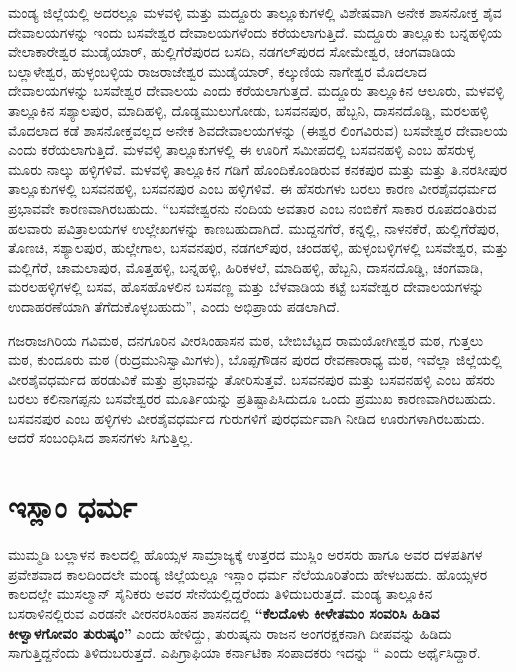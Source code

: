 ಮಂಡ್ಯ ಜಿಲ್ಲೆಯಲ್ಲಿ ಅದರಲ್ಲೂ ಮಳವಳ್ಳಿ ಮತ್ತು ಮದ್ದೂರು ತಾಲ್ಲೂಕುಗಳಲ್ಲಿ ವಿಶೇಷವಾಗಿ ಅನೇಕ ಶಾಸನೋಕ್ತ ಶೈವ ದೇವಾಲಯಗಳನ್ನು ಇಂದು ಬಸವೇಶ್ವರ ದೇವಾಲಯಗಳೆಂದು ಕರೆಯಲಾಗುತ್ತಿದೆ. ಮದ್ದೂರು ತಾಲ್ಲೂಕು ಬನ್ನಹಳ್ಳಿಯ ವೇಲಾಕಾರೇಶ್ವರ ಮುಡೈಯಾರ್​, ಹುಲ್ಲಿಗೆರೆಪುರದ ಬಸದಿ, ನಡಗಲ್​ಪುರದ ಸೋಮೇಶ್ವರ, ಚಂಗವಾಡಿಯ ಬಲ್ಲಾಳೇಶ್ವರ, ಹುಳ್ಳಂಬಳ್ಳಿಯ ರಾಜರಾಜೇಶ್ವರ ಮುಡೈಯಾರ್​, ಕಲ್ಕುಣಿಯ ನಾಗೇಶ್ವರ ಮೊದಲಾದ ದೇವಾಲಯಗಳನ್ನು ಬಸವೇಶ್ವರ ದೇವಾಲಯ ಎಂದು ಕರೆಯಲಾಗುತ್ತದೆ. ಮದ್ದೂರು ತಾಲ್ಲೂಕಿನ ಆಲೂರು, ಮಳವಳ್ಳಿ ತಾಲ್ಲೂಕಿನ ಸಶ್ಯಾಲಪುರ, ಮಾದಿಹಳ್ಳಿ, ದೊಡ್ಡಮುಲುಗೋಡು, ಬಸವನಪುರ, ಹೆಬ್ಬನಿ, ದಾಸನದೊಡ್ಡಿ, ಮರಲಹಳ್ಳಿ ಮೊದಲಾದ ಕಡೆ ಶಾಸನೋಕ್ತವಲ್ಲದ ಅನೇಕ ಶಿವದೇವಾಲಯಗಳನ್ನು (ಈಶ್ವರ ಲಿಂಗವಿರುವ) ಬಸವೇಶ್ವರ ದೇವಾಲಯ ಎಂದು ಕರೆಯಲಾಗುತ್ತಿದೆ. ಮಳವಳ್ಳಿ ತಾಲ್ಲೂಕುಗಳಲ್ಲಿ ಈ ಊರಿಗೆ ಸಮೀಪದಲ್ಲಿ ಬಸವನಹಳ್ಳಿ ಎಂಬ ಹೆಸರುಳ್ಳ ಮೂರು ನಾಲ್ಕು ಹಳ್ಳಿಗಳಿವೆ. ಮಳವಳ್ಳಿ ತಾಲ್ಲೂಕಿನ ಗಡಿಗೆ ಹೊಂದಿಕೊಂಡಿರುವ ಕನಕಪುರ ಮತ್ತು ಮತ್ತು ತಿ.ನರಸೀಪುರ ತಾಲ್ಲೂಕುಗಳಲ್ಲಿ ಬಸವನಹಳ್ಳಿ, ಬಸವನಪುರ ಎಂಬ ಹಳ್ಳಿಗಳಿವೆ. ಈ ಹೆಸರುಗಳು ಬರಲು ಕಾರಣ ವೀರಶೈವಧರ್ಮದ ಪ್ರಭಾವವೇ ಕಾರಣವಾಗಿರಬಹುದು. “ಬಸವೇಶ್ವರನು ನಂದಿಯ ಅವತಾರ ಎಂಬ ನಂಬಿಕೆಗೆ ಸಾಕಾರ ರೂಪದಂತಿರುವ ಹಲವಾರು ಪವಿತ್ರಾಲಯಗಳ ಉಲ್ಲೇಖಗಳನ್ನು ಕಾಣಬಹುದಾಗಿದೆ. ಮುದ್ದನಗೆರೆ, ಕನ್ನಲ್ಲಿ, ನಾಳನಕೆರೆ, ಹುಲ್ಲಿಗೆರೆಪುರ, ತೊಣಚಿ, ಸಶ್ಯಾಲಪುರ, ಹುಲ್ಲೇಗಾಲ, ಬಸವನಪುರ, ನಡಗಲ್​ಪುರ, ಚಂದಹಳ್ಳಿ, ಹುಳ್ಳಂಬಳ್ಳಿಗಳಲ್ಲಿ ಬಸವೇಶ್ವರ, ಮತ್ತು ಮಲ್ಲಿಗೆರೆ, ಚಾಮಲಾಪುರ, ಮೊತ್ತಹಳ್ಳಿ, ಬನ್ನಹಳ್ಳಿ, ಹಿರಿಕಳಲೆ, ಮಾದಿಹಳ್ಳಿ, ಹೆಬ್ಬನಿ, ದಾಸನದೊಡ್ಡಿ, ಚಂಗವಾಡಿ, ಮರಲಹಳ್ಳಿಗಳಲ್ಲಿ ಬಸವ, ಹೊಸಹೊಳಲಿನ ಬಸವಣ್ಣ ಮತ್ತು ಬೆಳವಾಡಿಯ ಕಟ್ಟೆ ಬಸವೇಶ್ವರ ದೇವಾಲಯಗಳನ್ನು ಉದಾಹರಣೆಯಾಗಿ ತೆಗೆದುಕೊಳ್ಳಬಹುದು”,  ಎಂದು ಅಭಿಪ್ರಾಯ ಪಡಲಾಗಿದೆ.

ಗಜರಾಜಗಿರಿಯ ಗವಿಮಠ, ದನಗೂರಿನ ವೀರಸಿಂಹಾಸನ ಮಠ, ಬೇಬಿಬೆಟ್ಟದ ರಾಮಯೋಗೀಶ್ವರ ಮಠ, ಗುತ್ತಲು ಮಠ, ಕುಂದೂರು ಮಠ (ರುದ್ರಮುನಿಸ್ವಾಮಿಗಳು), ಬೊಪ್ಪಗೌಡನ ಪುರದ ರೇವಣಾರಾಧ್ಯ ಮಠ, ಇವೆಲ್ಲಾ ಜಿಲ್ಲೆಯಲ್ಲಿ ವೀರಶೈವಧರ್ಮದ ಹರಡುವಿಕೆ ಮತ್ತು ಪ್ರಭಾವನ್ನು ತೋರಿಸುತ್ತವೆ. ಬಸವನಪುರ ಮತ್ತು ಬಸವನಹಳ್ಳಿ ಎಂಬ ಹೆಸರು ಬರಲು ಕಲಿನಾಗಪ್ಪನು ಬಸವೇಶ್ವರರ ಮೂರ್ತಿಯನ್ನು ಪ್ರತಿಷ್ಟಾಪಿಸಿದುದೂ ಒಂದು ಪ್ರಮುಖ ಕಾರಣವಾಗಿರಬಹುದು. ಬಸವನಪುರ ಎಂಬ ಹಳ್ಳಿಗಳು ವೀರಶೈವಧರ್ಮದ ಗುರುಗಳಿಗೆ ಪುರಧರ್ಮವಾಗಿ ನೀಡಿದ ಊರುಗಳಾಗಿರಬಹುದು. ಆದರೆ ಸಂಬಂಧಿಸಿದ ಶಾಸನಗಳು ಸಿಗುತ್ತಿಲ್ಲ.


\section{ಇಸ್ಲಾಂ ಧರ್ಮ}

ಮುಮ್ಮಡಿ ಬಲ್ಲಾಳನ ಕಾಲದಲ್ಲಿ ಹೊಯ್ಸಳ ಸಾಮ್ರಾಜ್ಯಕ್ಕೆ ಉತ್ತರದ ಮುಸ್ಲಿಂ ಅರಸರು ಹಾಗೂ ಅವರ ದಳಪತಿಗಳ ಪ್ರವೇಶವಾದ ಕಾಲದಿಂದಲೇ ಮಂಡ್ಯ ಜಿಲ್ಲೆಯಲ್ಲೂ ಇಸ್ಲಾಂ ಧರ್ಮ ನೆಲೆಯೂರಿತೆಂದು ಹೇಳಬಹದು. ಹೊಯ್ಸಳರ ಕಾಲದಲ್ಲೇ ಮುಸಲ್ಮಾನ್​ ಸೈನಿಕರು ಅವರ ಸೇನೆಯಲ್ಲಿದ್ದರೆಂದು ತಿಳಿದುಬರುತ್ತದೆ. ಮಂಡ್ಯ ತಾಲ್ಲೂಕಿನ ಬಸರಾಳಿನಲ್ಲಿರುವ ಎರಡನೇ ವೀರನರಸಿಂಹನ ಶಾಸನದಲ್ಲಿ \textbf{“ಕೆಲದೊಳು ಕೀಳೇತಮಂ ಸಂವರಿಸಿ ಹಿಡಿವ ಕೀಳ್ವಾಳಗೋವಂ ತುರುಷ್ಕಂ” }ಎಂದು ಹೇಳಿದ್ದು, ತುರುಷ್ಕನು ರಾಜನ ಅಂಗರಕ್ಷಕನಾಗಿ ದೀಪವನ್ನು ಹಿಡಿದು ಸಾಗುತ್ತಿದ್ದನೆಂದು ತಿಳಿದುಬರುತ್ತದೆ. ಎಪಿಗ್ರಾಫಿಯಾ ಕರ್ನಾಟಿಕಾ ಸಂಪಾದಕರು ಇದನ್ನು “  ಎಂದು ಅರ್ಥೈಸಿದ್ದಾರೆ.

